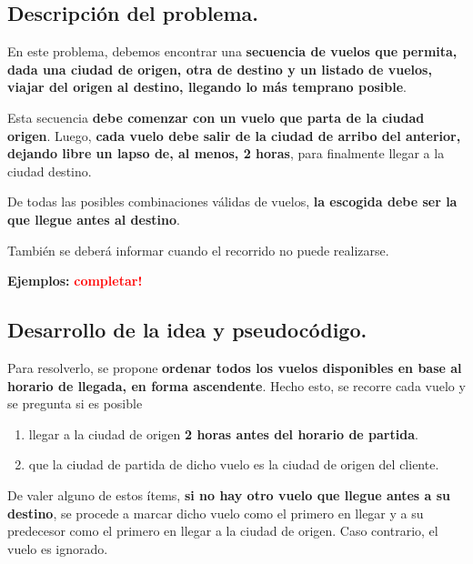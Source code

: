\subsection{Descripción del problema.}

\vspace*{0.3cm}

En este problema, debemos encontrar una \textbf{secuencia de vuelos que
permita, dada una ciudad de origen, otra de destino y un listado de vuelos, 
viajar del origen al destino, llegando lo más temprano posible}.

Esta secuencia \textbf{debe comenzar con un vuelo que parta de la ciudad 
origen}. Luego, \textbf{cada vuelo debe salir de la ciudad de arribo del 
anterior, dejando libre un lapso de, al menos, 2 horas}, para finalmente 
llegar a la ciudad destino. 

De todas las posibles combinaciones válidas de vuelos, \textbf{la escogida 
debe ser la que llegue antes al destino}.

También se deberá informar cuando el recorrido no puede realizarse.

\vspace*{0.5cm}

\textbf{Ejemplos:}
  \textcolor{red}{\textbf{completar!}}



\newpage
\subsection{Desarrollo de la idea y pseudocódigo.}

\vspace*{0.3cm}

Para resolverlo, se propone \textbf{ordenar todos los vuelos disponibles 
en base al horario de llegada, en forma ascendente}. Hecho esto, se recorre 
cada vuelo y se pregunta si es posible

\begin{enumerate}
  \item llegar a la ciudad de origen \textbf{2 horas antes del horario de partida}.
  \item que la ciudad de partida de dicho vuelo es la ciudad de origen del cliente.
\end{enumerate}

De valer alguno de estos ítems, \textbf{si no hay otro vuelo que llegue antes 
a su destino}, se procede a marcar dicho vuelo como el primero en llegar y a 
su predecesor como el primero en llegar a la ciudad de origen. Caso contrario, 
el vuelo es ignorado.

